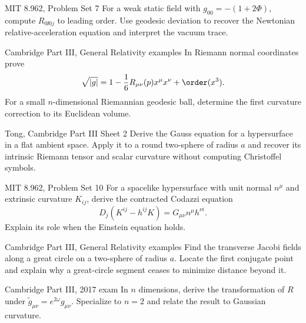 \begin{exercise}{MIT 8.962, Problem Set 7}
For a weak static field with \(g_{00}=-(1+2\Phi)\), compute
\(R_{0\ii0j}\) to leading order.  Use geodesic deviation to recover the
Newtonian relative-acceleration equation and interpret the vacuum trace.
\end{exercise}

\begin{exercise}{Cambridge Part III, General Relativity examples}
In Riemann normal coordinates prove
\[
\sqrt{|g|}=1-\frac16R_{\mu\nu}(p)x^\mu x^\nu+\order(x^3).
\]
For a small \(n\)-dimensional Riemannian geodesic ball, determine the first
curvature correction to its Euclidean volume.
\end{exercise}

\begin{exercise}{Tong, Cambridge Part III Sheet 2}
Derive the Gauss equation for a hypersurface in a flat ambient space.  Apply
it to a round two-sphere of radius \(a\) and recover its intrinsic Riemann
tensor and scalar curvature without computing Christoffel symbols.
\end{exercise}

\begin{exercise}{MIT 8.962, Problem Set 10}
For a spacelike hypersurface with unit normal \(n^\mu\) and extrinsic
curvature \(K_{ij}\), derive the contracted Codazzi equation
\[
D_j(K^{ij}-h^{ij}K)=G_{\mu\nu}n^\mu h^{\nu i}.
\]
Explain its role when the Einstein equation holds.
\end{exercise}

\begin{exercise}{Cambridge Part III, General Relativity examples}
Find the transverse Jacobi fields along a great circle on a two-sphere of
radius \(a\).  Locate the first conjugate point and explain why a great-circle
segment ceases to minimize distance beyond it.
\end{exercise}

\begin{exercise}{Cambridge Part III, 2017 exam}
In \(n\) dimensions, derive the transformation of \(R\) under
\(\widetilde g_{\mu\nu}=e^{2\omega}g_{\mu\nu}\).  Specialize to \(n=2\) and
relate the result to Gaussian curvature.
\end{exercise}

